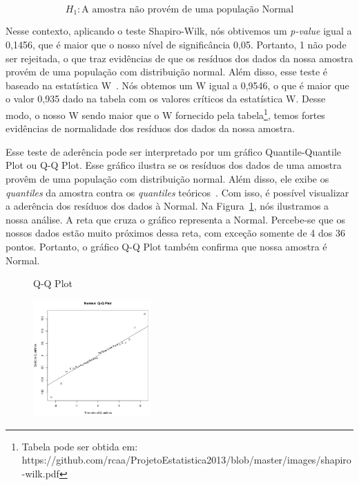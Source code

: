 \begin{equation}
	H_{1} : \text{A amostra não provém de uma população Normal}
\end{equation}

Nesse contexto, aplicando o teste Shapiro-Wilk, nós obtivemos um \emph{p-value} igual a 0,1456, que é maior que o nosso nível de significância 0,05. Portanto, 1 não pode ser rejeitada, o que traz evidências de que os resíduos dos dados da nossa amostra provém de uma população com distribuição normal. Além disso, esse teste é baseado na estatística W~\cite{estatisticaw}. Nós obtemos um W igual a 0,9546, o que é maior que o valor 0,935 dado na tabela com os valores críticos da estatística W. Desse modo, o nosso W sendo maior que o W fornecido pela tabela\footnote{Tabela pode ser obtida em: https://github.com/rcaa/ProjetoEstatistica2013/blob/master/images/shapiro-wilk.pdf}, temos fortes evidências de normalidade dos resíduos dos dados da nossa amostra.

Esse teste de aderência pode ser interpretado por um gráfico Quantile-Quantile Plot ou Q-Q Plot. Esse gráfico ilustra se os resíduos dos dados de uma amostra provêm de uma população com distribuição normal. Além disso, ele exibe os \emph{quantiles} da amostra contra os \emph{quantiles} teóricos~\cite{Wilk1968}. Com isso, é possível visualizar a aderência dos resíduos dos dados à Normal. Na Figura~\ref{fig:grafico1}, nós ilustramos a nossa análise. A reta que cruza o gráfico representa a Normal. Percebe-se que os nossos dados estão muito próximos dessa reta, com exceção somente de 4 dos 36 pontos. Portanto, o gráfico Q-Q Plot também confirma que nossa amostra é Normal.


\begin{figure}[t]
	\caption{Q-Q Plot}
    \centering
    \includegraphics[width=0.4\textwidth]{images/qqplot.png}
    \caption{}
    \label{fig:grafico1}
\end{figure}